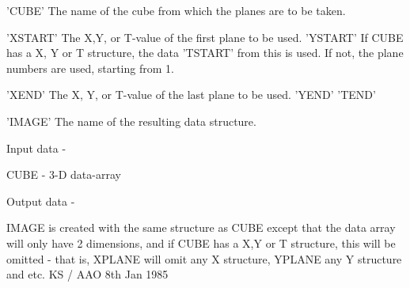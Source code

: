 \begin{description}
\begin{terminalv}
 'CUBE'     The name of the cube from which the planes
            are to be taken.

 'XSTART'   The X,Y, or T-value of the first plane to be used.
 'YSTART'   If CUBE has a X, Y or T  structure, the data
 'TSTART'   from this is used.  If not, the plane numbers
            are used, starting from 1.

 'XEND'     The X, Y, or T-value of the last plane to be used.
 'YEND'
 'TEND'

 'IMAGE'    The name of the resulting data structure.

 Input data -

 CUBE - 3-D data-array

 Output data -

 IMAGE is created with the same structure as CUBE
 except that the data array will only have 2 dimensions, and if
 CUBE has a X,Y or T structure, this will be omitted -
 that is, XPLANE will omit any X structure, YPLANE any
 Y structure and  etc.
                                 KS / AAO 8th Jan 1985
\end{terminalv}
\end{description}
